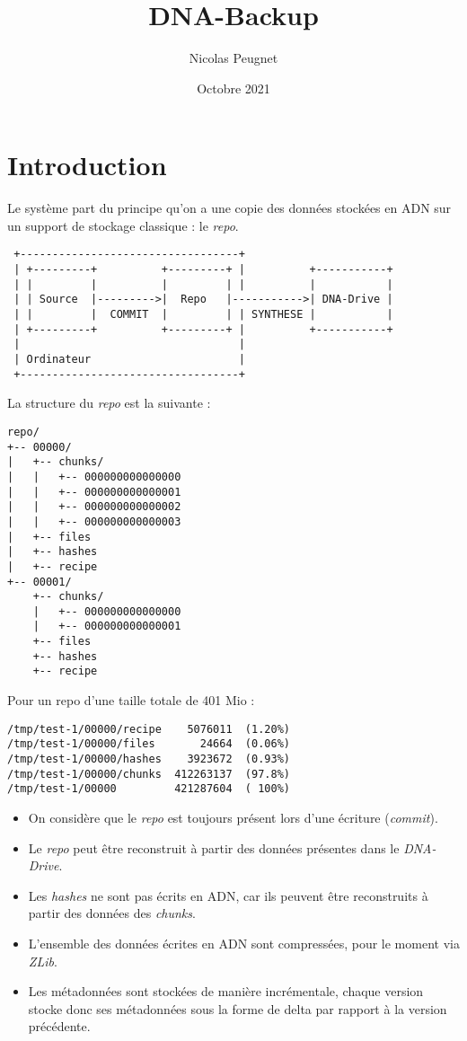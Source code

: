 \documentclass[a4paper]{article}
\title{DNA-Backup}
\date{Octobre 2021}
\author{Nicolas Peugnet}
\begin{document}
\maketitle

\tableofcontents

\section{Introduction}

Le système part du principe qu'on a une copie des données stockées en
ADN sur un support de stockage classique : le \emph{repo}.

\begin{verbatim}
 +----------------------------------+
 | +---------+          +---------+ |          +-----------+
 | |         |          |         | |          |           |
 | | Source  |--------->|  Repo   |----------->| DNA-Drive |
 | |         |  COMMIT  |         | | SYNTHESE |           |
 | +---------+          +---------+ |          +-----------+
 |                                  |
 | Ordinateur                       |
 +----------------------------------+
\end{verbatim}

La structure du \emph{repo} est la suivante :

\begin{verbatim}
repo/
+-- 00000/
|   +-- chunks/
|   |   +-- 000000000000000
|   |   +-- 000000000000001
|   |   +-- 000000000000002
|   |   +-- 000000000000003
|   +-- files
|   +-- hashes
|   +-- recipe
+-- 00001/
    +-- chunks/
    |   +-- 000000000000000
    |   +-- 000000000000001
    +-- files
    +-- hashes
    +-- recipe
\end{verbatim}

Pour un repo d'une taille totale de 401 Mio :

\begin{verbatim}
/tmp/test-1/00000/recipe    5076011  (1.20%)
/tmp/test-1/00000/files       24664  (0.06%)
/tmp/test-1/00000/hashes    3923672  (0.93%)
/tmp/test-1/00000/chunks  412263137  (97.8%)
/tmp/test-1/00000         421287604  ( 100%)
\end{verbatim}

\begin{itemize}
\item
  On considère que le \emph{repo} est toujours présent lors d'une
  écriture (\emph{commit}).
\item
  Le \emph{repo} peut être reconstruit à partir des données présentes
  dans le \emph{DNA-Drive}.
\item
  Les \emph{hashes} ne sont pas écrits en ADN, car ils peuvent être
  reconstruits à partir des données des \emph{chunks}.
\item
  L'ensemble des données écrites en ADN sont compressées, pour le moment
  via \emph{ZLib}.
\item
  Les métadonnées sont stockées de manière incrémentale, chaque version
  stocke donc ses métadonnées sous la forme de delta par rapport à la
  version précédente.
\end{itemize}
\end{document}
